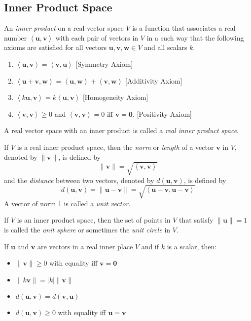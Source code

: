 \documentclass{report}
\begin{document}
		\subsection{Inner Product Space}\label{chap_inner_product_space}
			\begin{defn}
				An \emph{inner product} on a real vector space $V$ is a function that associates a real number $\left<\bm{u},\bm{v}\right>$ with each pair of vectors in $V$ in a such way that the following axioms are satisfied for all vectors $\bm{u},\bm{v},\bm{w}\in V$ and all scalars $k$.
				\begin{enumerate}
					\item $\left<\bm{u},\bm{v}\right>=\left<\bm{v},\bm{u}\right>$ [Symmetry Axiom]
					\item $\left<\bm{u}+\bm{v},\bm{w}\right>=\left<\bm{u},\bm{w}\right>+\left<\bm{v},\bm{w}\right>$ [Additivity Axiom]
					\item $\left<k\bm{u},\bm{v}\right>=k\left<\bm{u},\bm{v}\right>$ [Homogeneity Axiom]
					\item $\left<\bm{v},\bm{v}\right> \ge 0$ and $\left<\bm{v},\bm{v}\right>=0$ iff $\bm{v}=\bm{0}$. [Positivity Axiom]
				\end{enumerate}
				A real vector space with an inner product is called a \emph{real inner product space}.
			\end{defn}
			
			\begin{defn}
				If $V$ is a real inner product space, then the \emph{norm} or \emph{length} of a vector $\bm{v}$ in $V$, denoted by $\|\bm{v}\|$, is defined by
				\begin{displaymath}
					\|\bm{v}\|=\sqrt{\left<\bm{v},\bm{v}\right>}
				\end{displaymath}
				and the \emph{distance} between two vectors, denoted by $d(\bm{u},\bm{v})$, is defined by
				\begin{displaymath}
					d(\bm{u},\bm{v})=\|\bm{u}-\bm{v}\|=\sqrt{\left<\bm{u}-\bm{v},\bm{u}-\bm{v}\right>}
				\end{displaymath}
				A vector of norm 1 is called a \emph{unit vector}.
			\end{defn}
			
			If $V$ is an inner product space, then the set of points in $V$ that satisfy $\|\bm{u}\|=1$ is called the \emph{unit sphere} or sometimes the \emph{unit circle} in $V$.
			
			\begin{thm}
				If $\bm{u}$ and $\bm{v}$ are vectors in a real inner place $V$ and if $k$ is a scalar, then:
				\begin{itemize}
					\item $\|\bm{v}\| \ge 0$ with equality iff $\bm{v}=\bm{0}$
					\item $\|k\bm{v}\|=|k|\|\bm{v}\|$
					\item $d(\bm{u},\bm{v})=d(\bm{v},\bm{u})$
					\item $d(\bm{u},\bm{v}) \ge 0$ with equality iff $\bm{u}=\bm{v}$
				\end{itemize}
			\end{thm}
			
\end{document}
